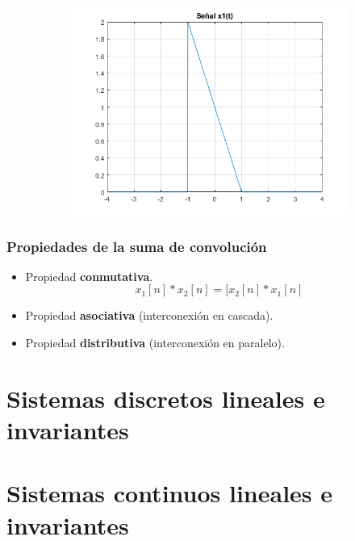 \documentclass[a4paper]{book}
\begin{document}
\begin{myenumerate}
\begin{figure}[!ht]
\caption{}
\label{fig:Problema_1_b}
\centering
\begin{subfigure}[b]{0.7\linewidth}
\includegraphics[width=\linewidth]{./Imágenes/aau.png}
\end{subfigure}
\end{figure}

\end{myenumerate}


\setlength{\leftskip}{0pt}
\setlength{\rightskip}{0pt}


\subsubsection{Propiedades de la suma de convolución}
\vspace{\parskip}
\begin{itemize}
\item Propiedad \textbf{conmutativa}. \[x_1[n]*x_2[n]=[x_2[n]*x_1[n] \]
\item Propiedad \textbf{asociativa} (interconexión en cascada).
\item Propiedad \textbf{distributiva} (interconexión en paralelo).
\end{itemize}

\section{Sistemas discretos lineales e invariantes}


\section{Sistemas continuos lineales e invariantes}
\end{document}
